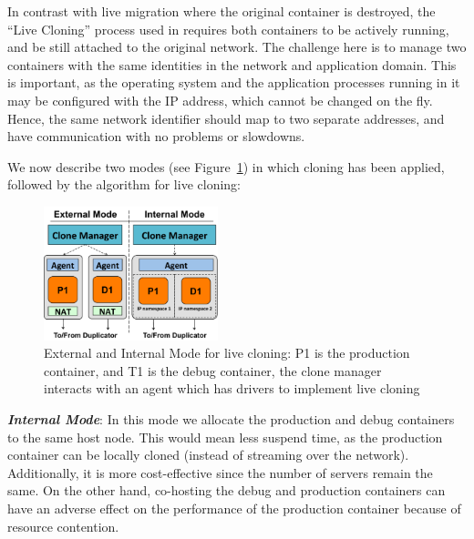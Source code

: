 In contrast with live migration where the original container is destroyed, the ``Live Cloning'' process used in \parikshan requires both containers to be actively running, and be still attached to the original network.
The challenge here is to manage two containers with the same identities in the network and application domain. 
This is important, as the operating system and the application processes running in it may be configured with the IP address, which cannot be changed on the fly.
Hence, the same network identifier should map to two separate addresses, and have communication with no problems or slowdowns.

We now describe two modes (see Figure~\ref{fig:modesCloning}) in which cloning has been applied, followed by the algorithm for live cloning:

\begin{figure}[t]
  \begin{center}
    \includegraphics[width=0.45\textwidth]{figs/ModesCloning.pdf}
    \caption{External and Internal Mode for live cloning: P1 is the production container, and T1 is the debug container, the clone manager interacts with an agent which has drivers to implement live cloning}
    \label{fig:modesCloning}
  \end{center}
\end{figure}


\noindent
\textbf{\textit{Internal Mode}}: In this mode we allocate the production and debug containers to the same host node. 
This would mean less suspend time, as the production container can be locally cloned (instead of streaming over the network). 
Additionally, it is more cost-effective since the number of servers remain the same.
On the other hand, co-hosting the debug and production containers can have an adverse effect on the performance of the production container because of resource contention.

